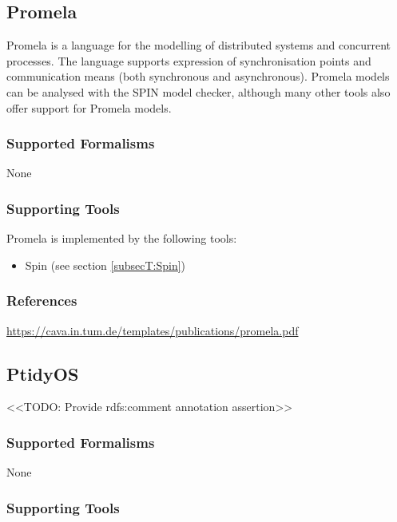 \subsection{Promela}
\label{subsecL:Promela}

Promela is a language for the modelling of distributed systems and concurrent processes.
The language supports expression of synchronisation points and communication means (both synchronous and asynchronous). 
Promela models can be analysed with the SPIN model checker, although many other tools also offer support for Promela models.

\subsubsection{Supported Formalisms}

None


\subsubsection{Supporting Tools}

Promela is implemented by the following tools:
\begin{itemize}
	\item Spin (see section \ref{subsecT:Spin})
\end{itemize}


\subsubsection{References}
\url{https://cava.in.tum.de/templates/publications/promela.pdf}




\subsection{PtidyOS}
\label{subsecL:PtidyOS}



<<TODO: Provide rdfs:comment annotation assertion>>

\subsubsection{Supported Formalisms}

None


\subsubsection{Supporting Tools}

